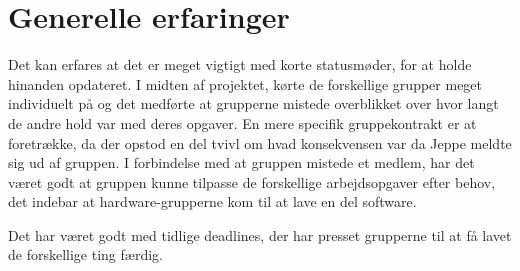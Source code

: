 \section{Generelle erfaringer}

Det kan erfares at det er meget vigtigt med korte statusmøder, for at holde hinanden opdateret. I midten af projektet, kørte de forskellige grupper meget individuelt på og det medførte at grupperne mistede overblikket over hvor langt de andre hold var med deres opgaver. En mere specifik gruppekontrakt er at foretrække, da der opstod en del tvivl om hvad konsekvensen var da Jeppe meldte sig ud af gruppen. I forbindelse med at gruppen mistede et medlem, har det været godt at gruppen kunne tilpasse de forskellige arbejdsopgaver efter behov, det indebar at hardware-grupperne kom til at lave en del software. 

Det har været godt med tidlige deadlines, der har presset grupperne til at få lavet de forskellige ting færdig.
